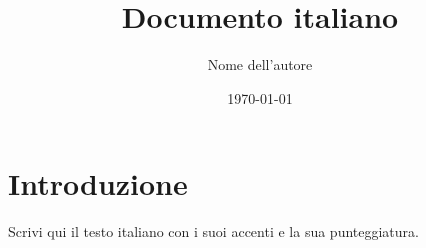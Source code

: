 \documentclass[11pt,a4paper]{article}
\title{Documento italiano}
\author{Nome dell'autore}
\date{\today}
\begin{document}
\maketitle
\section{Introduzione}
Scrivi qui il testo italiano con i suoi accenti e la sua punteggiatura.
\end{document}
